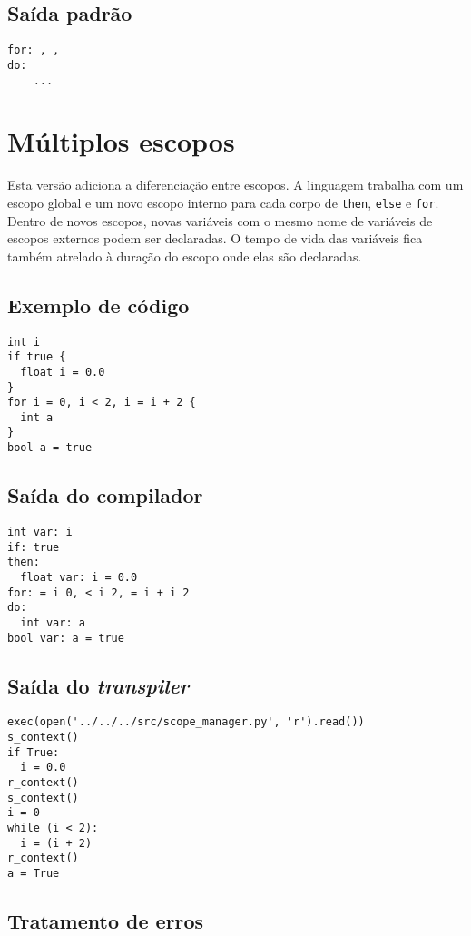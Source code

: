 \documentclass{article}
\begin{document}
\subsection{Saída padrão}

\begin{verbatim}
for: , ,
do:
    ...
\end{verbatim}

\section{Múltiplos escopos}

Esta versão adiciona a diferenciação entre escopos. A linguagem trabalha com
um escopo global e um novo escopo interno para cada corpo de \texttt{then},
\texttt{else} e \texttt{for}. Dentro de novos escopos, novas variáveis com o
mesmo nome de variáveis de escopos externos podem ser declaradas. O tempo de
vida das variáveis fica também atrelado à duração do escopo onde elas são
declaradas.

\subsection{Exemplo de código}

\begin{verbatim}
int i
if true {
  float i = 0.0
}
for i = 0, i < 2, i = i + 2 {
  int a
}
bool a = true
\end{verbatim}

\subsection{Saída do compilador}

\begin{verbatim}
int var: i
if: true
then:
  float var: i = 0.0
for: = i 0, < i 2, = i + i 2
do:
  int var: a
bool var: a = true
\end{verbatim}

\subsection{Saída do \emph{transpiler}}

\begin{verbatim}
exec(open('../../../src/scope_manager.py', 'r').read())
s_context()
if True:
  i = 0.0
r_context()
s_context()
i = 0
while (i < 2):
  i = (i + 2)
r_context()
a = True
\end{verbatim}

\subsection{Tratamento de erros}
\end{document}
